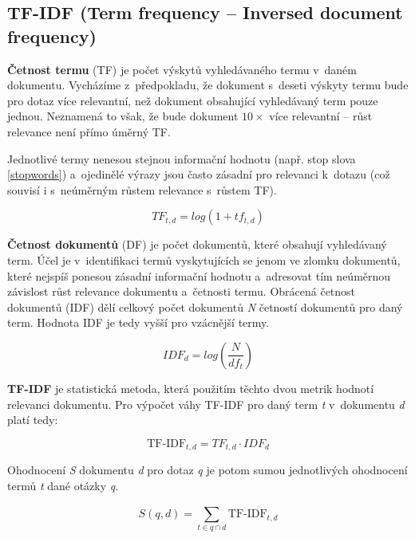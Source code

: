 \subsection{TF-IDF (Term frequency -- Inversed document frequency)}
\label{tf-idf}

\textbf{Četnost termu} (TF) je počet výskytů vyhledávaného termu v~daném dokumentu. Vycházíme z~předpokladu, že dokument s~deseti výskyty termu bude pro dotaz více relevantní, než dokument obsahující vyhledávaný term pouze jednou. Neznamená to však, že bude dokument $10\times$ více relevantní -- růst relevance není přímo úměrný TF.\par
Jednotlivé termy nenesou stejnou informační hodnotu (např. stop slova \ref{stopwords}) a~ojedinělé výrazy jsou často zásadní pro relevanci k~dotazu (což souvisí i s~neúměrným růstem relevance s~růstem TF).\par

\begin{equation}
    TF_{t,d} = log(1+tf_{t,d})
\end{equation}

\textbf{Četnost dokumentů} (DF) je počet dokumentů, které obsahují vyhledávaný term. Účel je v~identifikaci termů vyskytujících se jenom ve zlomku dokumentů, které nejspíš ponesou zásadní informační hodnotu a~adresovat tím neúměrnou závislost růst relevance dokumentu a~četnosti termu. Obrácená četnost dokumentů (IDF) dělí celkový počet dokumentů \emph{N} četností dokumentů pro daný term. Hodnota IDF je tedy vyšší pro vzácnější termy.\par

\begin{equation}
    IDF_{d} = log(\frac{N}{df_t})
\end{equation}

\textbf{TF-IDF} je statistická metoda, která použitím těchto dvou metrik hodnotí relevanci dokumentu.
Pro výpočet váhy TF-IDF pro daný term \emph{t} v~dokumentu \emph{d} platí tedy:

\begin{equation}
    \text{TF-IDF}_{t,d} = TF_{t,d} \cdot IDF_d
\end{equation}

Ohodnocení \emph{S} dokumentu \emph{d} pro dotaz \emph{q} je potom sumou jednotlivých ohodnocení termů \emph{t} dané otázky \emph{q}.

\begin{equation}
    S(q,d) = \sum_{t\in{q \cap d}}^{}\text{TF-IDF}_{t,d}
\end{equation}

